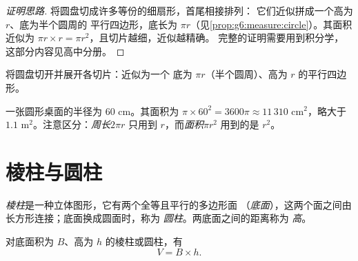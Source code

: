 \begin{proof}[证明思路]
将圆盘切成许多等份的细扇形，首尾相接排列：
它们近似拼成一个高为 $r$、底为半个圆周的
平行四边形，底长为 $\pi r$（见\cref{prop:g6:measure:circle}）。其面积
近似为 $\pi r \times r = \pi r^2$，且切片越细，近似越精确。
完整的证明需要用到积分学，
这部分内容见高中分册。
\end{proof}

\begin{omfigure}

{\small 将圆盘切开并展开各切片：近似为一个
底为 $\pi r$（半个圆周）、高为 $r$ 的平行四边形。}
\end{omfigure}

\begin{example}\label{ex:g7:areas:disk}
一张圆形桌面的半径为 $60$ cm。其面积为
$\pi \times 60^2 = 3600\pi \approx 11\,310$ cm$^2$，略大于
$1.1$ m$^2$。注意区分：\emph{周长}$2\pi r$ 只用到
$r$，而\emph{面积}$\pi r^2$ 用到的是 $r^2$。
\end{example}

\section{棱柱与圆柱}

\begin{definition}[棱柱、圆柱]\label{def:g7:areas:prism}
\emph{棱柱}是一种立体图形，它有两个全等且平行的多边形面
（\emph{底面}），这两个面之间由长方形连接；底面换成圆面时，称为
\emph{圆柱}。两底面之间的距离称为
\emph{高}。
\end{definition}

\begin{theorem}[体积]\label{thm:g7:areas:volume}
对底面积为 $B$、高为 $h$ 的棱柱或圆柱，有
\[
V = B \times h .
\]
\end{theorem}
\admitted

